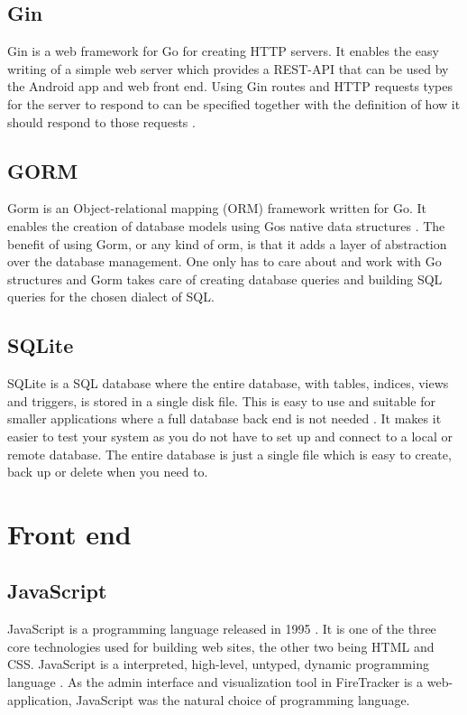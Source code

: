 \documentclass[../Main/thesis.tex]{subfiles}
\begin{document}
\subsection{Gin}
Gin is a web framework for Go for creating HTTP servers.
It enables the easy writing of a simple web server which provides a REST-API that can be used by the Android app and web front end. 
Using Gin routes and HTTP requests types for the server to respond to can be specified together with the definition of how it should respond to those requests \citep{Martinez-Almeida2017}.

\subsection{GORM}
Gorm is an Object-relational mapping (ORM) framework written for Go.
It enables the creation of database models using Gos native data structures \citep{JInzhuZhang2018}.
The benefit of using Gorm, or any kind of orm, is that it adds a layer of abstraction over the database management.
One only has to care about and work with Go structures and Gorm takes care of creating database queries and building SQL queries for the chosen dialect of SQL.

\subsection{SQLite}
SQLite is a SQL database where the entire database, with tables, indices, views and triggers, is stored in a single disk file.
This is easy to use and suitable for smaller applications where a full database back end is not needed \citep{Hipp2015}.
It makes it easier to test your system as you do not have to set up and connect to a local or remote database.
The entire database is just a single file which is easy to create, back up or delete when you need to.

\section{Front end}
\subsection{JavaScript}
JavaScript is a programming language released in 1995 \citep{Netscape1995}.
It is one of the three core technologies used for building web sites, the other two being HTML and CSS.
JavaScript is a interpreted, high-level, untyped, dynamic programming language \citep{Flanagan2011}.
As the admin interface and visualization tool in FireTracker is a web-application, JavaScript was the natural choice of programming language.
\end{document}
